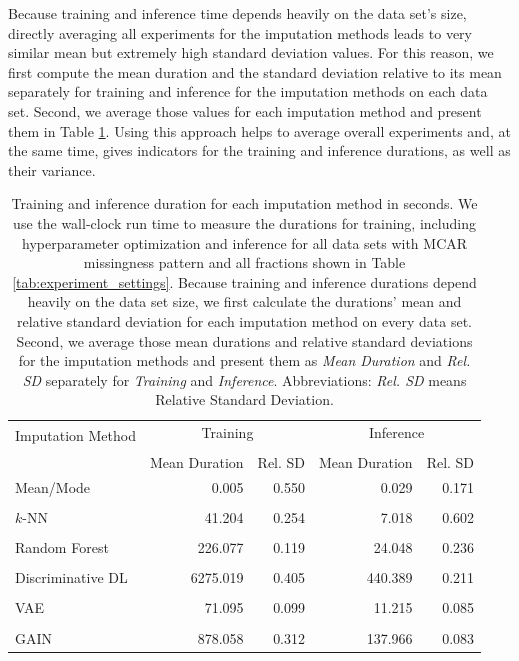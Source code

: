\documentclass[utf8]{frontiersSCNS} %
\begin{document}
Because training and inference time depends heavily on the data set's size, directly averaging all experiments for the imputation methods leads to very similar mean but extremely high standard deviation values. For this reason, we first compute the mean duration and the standard deviation relative to its mean separately for training and inference for the imputation methods on each data set. Second, we average those values for each imputation method and present them in Table \ref{tab:time}. Using this approach helps to average overall experiments and, at the same time, gives indicators for the training and inference durations, as well as their variance.
%
\begin{table}
	\centering
	\begin{tabular}{@{\extracolsep{4pt}}lrrrr@{}}
		\toprule
		\multirow{2}{*}{Imputation Method} & \multicolumn{2}{c}{Training} & \multicolumn{2}{c}{Inference} \\\cline{2-3}\cline{4-5}
		\\[-0.75em]
		& Mean Duration &   Rel. SD & Mean Duration &   Rel. SD \\
		\midrule
		Mean/Mode &      0.005 &  0.550 &      0.029 &  0.171 \\
		\\[-0.5em]
		$k$-NN &     41.204 &  0.254 &       7.018 &  0.602 \\
		\\[-0.5em]
		Random Forest &    226.077 &  0.119 &     24.048 &  0.236 \\
		\\[-0.5em]
		Discriminative DL &   6275.019 &   0.405 &    440.389 &  0.211 \\
		\\[-0.5em]
		VAE &     71.095 &  0.099 &      11.215 &  0.085 \\
		\\[-0.5em]
		GAIN &    878.058 &  0.312 &     137.966 &  0.083 \\
		\bottomrule
	\end{tabular}
	\caption{Training and inference duration for each imputation method in seconds. We use the wall-clock run time to measure the durations for training, including hyperparameter optimization and inference for all data sets with MCAR missingness pattern and all fractions shown in Table \ref{tab:experiment_settings}. Because training and inference durations depend heavily on the data set size, we first calculate the durations' mean and relative standard deviation for each imputation method on every data set. Second, we average those mean durations and relative standard deviations for the imputation methods and present them as \emph{Mean Duration} and \emph{Rel. SD} separately for \emph{Training} and \emph{Inference}. Abbreviations: \emph{Rel. SD} means Relative Standard Deviation.
	}
	\label{tab:time}
\end{table}
\end{document}
